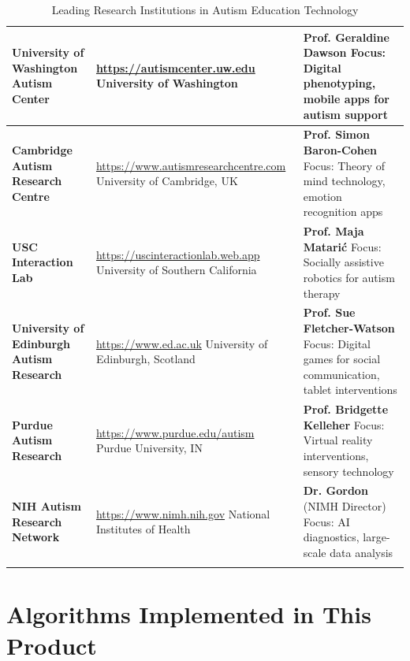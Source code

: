 \documentclass[12pt, a4paper]{article}
\begin{document}
\begin{longtable}{|>{\raggedright}p{4.5cm}|>{\raggedright}p{5cm}|>{\raggedright\arraybackslash}p{4.5cm}|}
\textbf{University of Washington Autism Center} & \url{https://autismcenter.uw.edu} \newline University of Washington & \textbf{Prof. Geraldine Dawson} \newline Focus: Digital phenotyping, mobile apps for autism support \\
\hline

\textbf{Cambridge Autism Research Centre} & \url{https://www.autismresearchcentre.com} \newline University of Cambridge, UK & \textbf{Prof. Simon Baron-Cohen} \newline Focus: Theory of mind technology, emotion recognition apps \\
\hline

\textbf{USC Interaction Lab} & \url{https://uscinteractionlab.web.app} \newline University of Southern California & \textbf{Prof. Maja Matarić} \newline Focus: Socially assistive robotics for autism therapy \\
\hline

\textbf{University of Edinburgh Autism Research} & \url{https://www.ed.ac.uk} \newline University of Edinburgh, Scotland & \textbf{Prof. Sue Fletcher-Watson} \newline Focus: Digital games for social communication, tablet interventions \\
\hline

\textbf{Purdue Autism Research} & \url{https://www.purdue.edu/autism} \newline Purdue University, IN & \textbf{Prof. Bridgette Kelleher} \newline Focus: Virtual reality interventions, sensory technology \\
\hline

\textbf{NIH Autism Research Network} & \url{https://www.nimh.nih.gov} \newline National Institutes of Health & \textbf{Dr. Gordon} (NIMH Director) \newline Focus: AI diagnostics, large-scale data analysis \\
\hline

\caption{Leading Research Institutions in Autism Education Technology}
\end{longtable}

\section{Algorithms Implemented in This Product}
\end{document}
